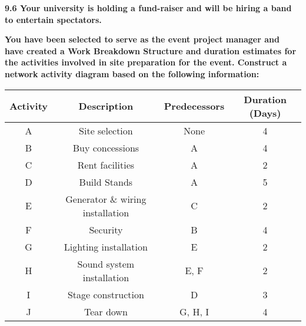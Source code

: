 \documentclass{article}
\begin{document}
\textbf{9.6  Your university is holding a fund-raiser and will be hiring a band to entertain spectators.}\\[0.2em]
\hspace*{0.6cm}
\begin{minipage}{0.94\textwidth}
    \textbf{You have been selected to serve as the event project manager and have created a Work Breakdown Structure and duration estimates for the activities involved in site preparation for the event. Construct a network activity diagram based on the following information:}
\end{minipage}
\begin{table}[h!]
    \centering
    \begin{tabular}{|c|c|c|c|}
    \hline
    \textbf{Activity} & \textbf{Description}                 & \textbf{Predecessors} & \textbf{Duration (Days)} \\ \hline
    A                 & Site selection                       & None                  & 4                        \\ \hline
    B                 & Buy concessions                      & A                     & 4                        \\ \hline
    C                 & Rent facilities                      & A                     & 2                        \\ \hline
    D                 & Build Stands                         & A                     & 5                        \\ \hline
    E                 & Generator \& wiring installation     & C                     & 2                        \\ \hline
    F                 & Security                             & B                     & 4                        \\ \hline
    G                 & Lighting installation                & E                     & 2                        \\ \hline
    H                 & Sound system installation            & E, F                  & 2                        \\ \hline
    I                 & Stage construction                   & D                     & 3                        \\ \hline
    J                 & Tear down                            & G, H, I               & 4                        \\ \hline
    \end{tabular}
\end{table}\\
\end{document}

